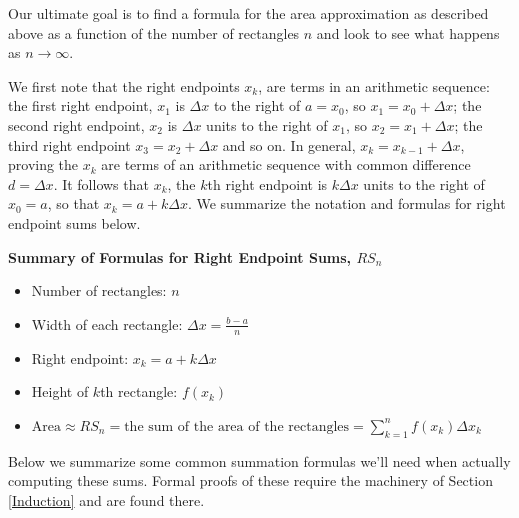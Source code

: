 \documentclass{ximera}
\begin{document}
Our ultimate goal is to find a formula for the area approximation as described above as a function of the number of rectangles $n$ and look to see what happens as $n \rightarrow \infty$.  

We first note that the right endpoints $x_{k}$, are terms in an arithmetic sequence:  the first right endpoint,   $x_{1}$ is $\Delta x$ to the right of $a = x_{0}$, so $x_{1} = x_{0} + \Delta x$;  the second right endpoint, $x_{2}$ is $\Delta x$ units to the right of $x_{1}$, so $x_{2} = x_{1} + \Delta x$;  the third right endpoint $x_{3} = x_{2} + \Delta x$ and so on. In general, $x_{k} = x_{k-1} + \Delta x$, proving the $x_{k}$ are terms of an arithmetic sequence with common difference $d = \Delta x$.   It follows that $x_{k}$, the $k$th right endpoint is $k \Delta x$ units to the right of $x_{0} = a$, so that  $x_{k} = a + k \Delta x$.  We summarize the notation and formulas for right endpoint sums below.

\begin{center}


\centerline{\textbf{Summary of Formulas for  Right Endpoint Sums, $RS_{n}$}}

\bigskip

\begin{itemize}

\item  Number of rectangles:  $n$ 

\item Width of each rectangle:  $\Delta x  = \frac{b-a}{n}$

\item Right endpoint:  $x_{k} = a + k \Delta x$ 

\item  Height of $k$th rectangle: $f(x_{k})$

\item $\text{Area} \approx RS_{n} = \text{the sum of the area of the rectangles} = \displaystyle{\sum_{k = 1}^{n} f(x_{k}) \Delta x_{k}}$

\end{itemize}


\end{center}

Below we summarize some common summation formulas we'll need when actually computing these sums.  Formal proofs of these require the machinery of Section \ref{Induction} and are found there.
\end{document}
